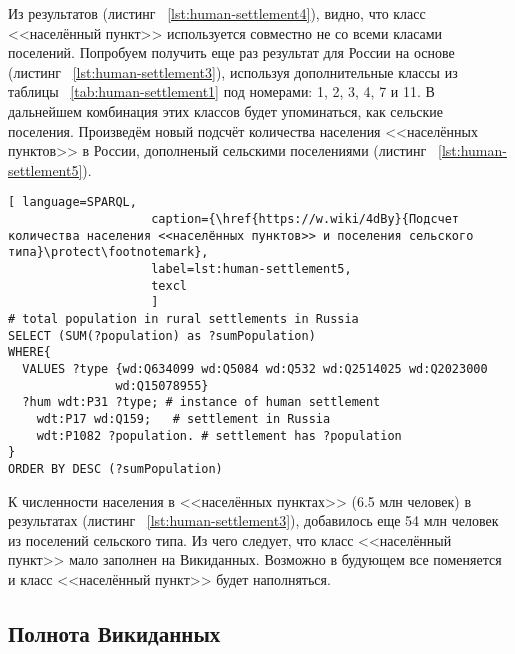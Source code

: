 Из результатов (листинг ~\protect\ref{lst:human-settlement4}), видно, что класс <<населённый пункт>> используется совместно не со всеми класами поселений. Попробуем получить еще раз результат для России на основе (листинг ~\protect\ref{lst:human-settlement3}), используя дополнительные классы из таблицы ~\ref{tab:human-settlement1} под номерами: 1, 2, 3, 4, 7 и 11. В дальнейшем комбинация этих классов будет упоминаться, как сельские поселения. Произведём новый подсчёт количества населения <<населённых пунктов>> в России, дополненый сельскими поселениями (листинг ~\protect\ref{lst:human-settlement5}).

\begin{lstlisting}[ language=SPARQL, 
                    caption={\href{https://w.wiki/4dBy}{Подсчет количества населения <<населённых пунктов>> и поселения сельского типа}\protect\footnotemark},
                    label=lst:human-settlement5,
                    texcl 
                    ]
# total population in rural settlements in Russia
SELECT (SUM(?population) as ?sumPopulation) 
WHERE{
  VALUES ?type {wd:Q634099 wd:Q5084 wd:Q532 wd:Q2514025 wd:Q2023000 
               wd:Q15078955}
  ?hum wdt:P31 ?type; # instance of human settlement
    wdt:P17 wd:Q159;   # settlement in Russia
    wdt:P1082 ?population. # settlement has ?population
}
ORDER BY DESC (?sumPopulation)
\end{lstlisting}%

К численности населения в <<населённых пунктах>> (\num{6,5} млн человек) в результатах (листинг ~\protect\ref{lst:human-settlement3}), добавилось еще \num{54} млн человек из поселений сельского типа. Из чего следует, что класс <<населённый пункт>> мало заполнен на Викиданных. Возможно в будующем все поменяется и класс <<населённый пункт>> будет наполняться. 


\subsection{Полнота Викиданных}

